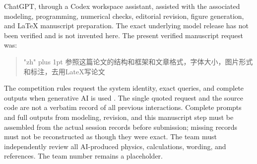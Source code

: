 \documentclass[11pt,a4paper]{article}
\begin{document}
ChatGPT, through a Codex workspace assistant, assisted with the associated modeling, programming, numerical checks, editorial revision, figure generation, and LaTeX manuscript preparation. The exact underlying model release has not been verified and is not invented here. The present verified manuscript request was:
\begin{quote}
{\zhfont\small\XeTeXlinebreaklocale "zh"\XeTeXlinebreakskip=0pt plus 1pt
参照这篇论文的结构和框架和文章格式，字体大小，图片形式和标注，去用LateX写论文}
\end{quote}
The competition rules request the system identity, exact queries, and complete outputs when generative AI is used \cite{rules}. The single quoted request and the source code are not a verbatim record of all previous interactions. Complete prompts and full outputs from modeling, revision, and this manuscript step must be assembled from the actual session records before submission; missing records must not be reconstructed as though they were exact. The team must independently review all AI-produced physics, calculations, wording, and references. The team number remains a placeholder.
\end{document}
